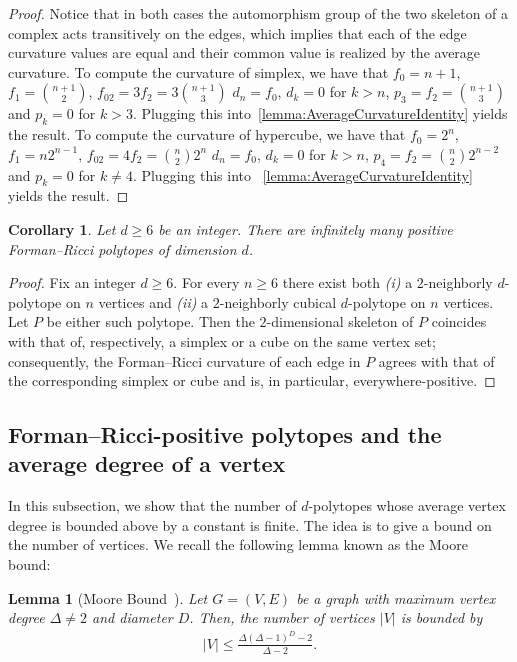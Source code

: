 \documentclass[11pt,a4paper]{amsart}
\newtheorem{corollary}[theorem]{Corollary}
\newtheorem{lemma}[theorem]{Lemma}
\begin{document}
\begin{proof}
    Notice that in both cases the automorphism group of the two skeleton of a complex acts transitively on the edges, which implies that each of the edge curvature values are equal and their common value is realized by the average curvature. To compute the curvature of simplex, we have that $f_0= n+1$, $f_1= \binom{n+1}{2}$, $f_{02}= 3f_2= 3\binom{n+1}3$ $d_n= f_0$, $d_k=0$ for $k>n$, $p_3=f_2 = \binom{n+1}{3}$ and $p_k=0$ for $k>3$. Plugging this into~\cref{lemma:AverageCurvatureIdentity} yields the result. To compute the curvature of hypercube, we have that $f_0= 2^n$, $f_1= n2^{n-1}$, $f_{02}= 4f_2= \binom{n}{2}2^{n}$ $d_n= f_0$, $d_k=0$ for $k>n$, $p_4=f_2 = \binom{n}{2}2^{n-2}$ and $p_k=0$ for $k\not=4$. Plugging this into ~\cref{lemma:AverageCurvatureIdentity} yields the result. 
\end{proof}

\begin{corollary}
    Let $d\ge 6$ be an integer. There are infinitely many positive Forman--Ricci polytopes of dimension $d$.
\end{corollary}

\begin{proof}
    Fix an integer $d\ge 6$. For every $n\ge 6$ there exist both \emph{(i)} a $2$-neighborly $d$-polytope on $n$ vertices and \emph{(ii)} a $2$-neighborly cubical $d$-polytope on $n$ vertices. Let $P$ be either such polytope. Then the $2$-dimensional skeleton of $P$ coincides with that of, respectively, a simplex or a cube on the same vertex set; consequently, the Forman--Ricci curvature of each edge in $P$ agrees with that of the corresponding simplex or cube and is, in particular, everywhere-positive.
\end{proof}

\subsection{Forman--Ricci-positive polytopes and the average degree of a vertex}\label{subsec:avg-degree}

In this subsection, we show that the number of $d$-polytopes whose average vertex degree is bounded above by a constant is finite. The idea is to give a bound on the number of vertices. We recall the following lemma known as the Moore bound:

\begin{lemma}[Moore Bound~\cite{hoffman1960moore,miller2012moore}]\label{lem: degdiam}
   Let $G = (V,E)$ be a graph with maximum vertex degree $\Delta \neq 2$ and diameter $D$. Then, the number of vertices $|V|$ is bounded by
         \begin{align*}
             |V| \leq \frac{\Delta (\Delta - 1)^D - 2}{\Delta - 2}.
         \end{align*}
\end{lemma} 
\end{document}

